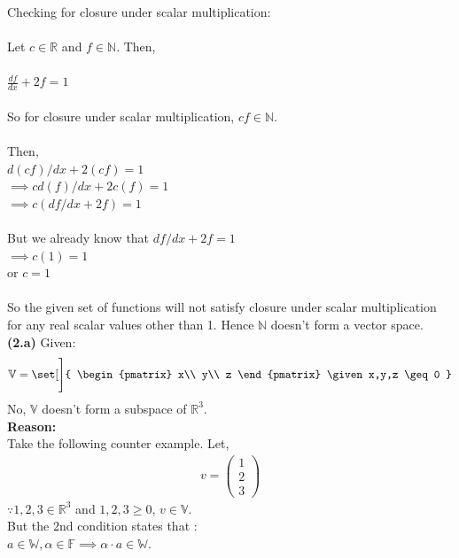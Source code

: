 \documentclass[12pt,letterpaper,fleqn]{article}
\theoremstyle{definition}
\begin{document}
 Checking for closure under scalar multiplication:\\
 \\
 Let $c \in \mathbb{R}$ and $f \in \mathbb{N}$. Then,\\
\\ 
 $\frac{df}{dx} + 2f = 1$\\
\\ 
 So for closure under scalar multiplication, $cf \in \mathbb{N}$.\\
\\ 
 Then,\\
  $d(cf)/dx + 2(cf) = 1$\\
  $\implies cd(f)/dx + 2c(f) = 1$\\
  $\implies c( df/dx + 2f ) = 1$\\
\\ 
  But we already know that $df/dx + 2f = 1$\\
  $\implies c (1) = 1$\\
  or $c = 1$\\
\\ 
  So the given set of functions will not satisfy closure under scalar multiplication for any real scalar values other than 1. Hence $\mathbb{N}$ doesn't form a vector space.\\ 
\newpage
\textbf{(2.a)} Given:
	\begin{align*}
	\mathbb{V} = \set[\Bigg]{
	\begin{pmatrix}
	x\\
	y\\
	z
\end{pmatrix}	\given x,y,z \geq 0	
	}
	\end{align*}
	No, $\mathbb{V}$ doesn't form a subspace of $\mathbb{R}^{3}$.\\
	\textbf{Reason:}\\
	Take the following counter example. Let,
	\begin{equation*}
	\begin{split}
	v = \begin{pmatrix}
	1\\
	2\\
	3
	\end{pmatrix}
	\end{split}
	\end{equation*}
	$ \because 1, 2, 3 \in \mathbb{R}^3$ and $1,2,3 \geq 0$, $v \in \mathbb{V}$.\\
	But the 2nd condition states that :\\
	$ a \in \mathbb{W}, \alpha \in \mathbb{F} \implies \alpha \cdot a \in \mathbb{W}$.\\
\end{document}
